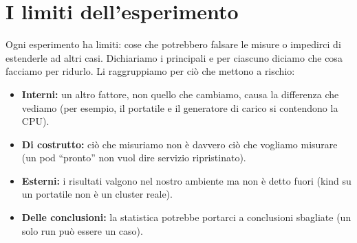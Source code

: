 \section{I limiti dell'esperimento}
\label{s:limiti}

Ogni esperimento ha limiti: cose che potrebbero falsare le misure o impedirci di estenderle ad altri casi. Dichiariamo i principali e per ciascuno diciamo che cosa facciamo per ridurlo. Li raggruppiamo per ciò che mettono a rischio:
\begin{itemize}
  \item \textbf{Interni:} un altro fattore, non quello che cambiamo, causa la differenza che vediamo (per esempio, il portatile e il generatore di carico si contendono la CPU).
  \item \textbf{Di costrutto:} ciò che misuriamo non è davvero ciò che vogliamo misurare (un pod ``pronto'' non vuol dire servizio ripristinato).
  \item \textbf{Esterni:} i risultati valgono nel nostro ambiente ma non è detto fuori (kind su un portatile non è un cluster reale).
  \item \textbf{Delle conclusioni:} la statistica potrebbe portarci a conclusioni sbagliate (un solo run può essere un caso).
\end{itemize}

